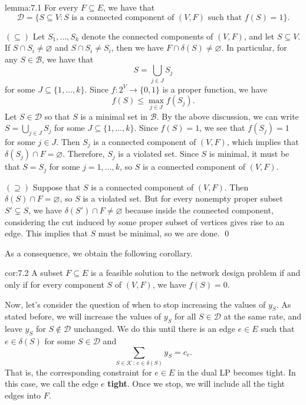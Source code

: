 \begin{lemma}{lemma:7.1} 
    For every $F \subseteq E$, we have that 
    \[ \mathcal{D} = \{S \subseteq V : \text{$S$ is a connected component of $(V, F)$ 
    such that $f(S) = 1$}\}. \]
\end{lemma}\vspace{-0.25cm}
\begin{pf}
    $(\subseteq)$  Let $S_1, \dots, S_k$ denote the connected components of $(V, F)$, 
    and let $S \subseteq V$. If $S \cap S_i \neq \varnothing$ and 
    $S \cap S_i \neq S_i$, then we have $F \cap \delta(S) \neq \varnothing$. 
    In particular, for any $S \in \mathcal{B}$, we have that 
    \[ S = \bigcup_{j \in J} S_j \] 
    for some $J \subseteq \{1, \dots, k\}$. Since $f : 2^V \to \{0, 1\}$ 
    is a proper function, we have 
    \[ f(S) \leq \max_{j\in J} f(S_j). \] 
    Let $S \in \mathcal{D}$ so that $S$ is a minimal set in $\mathcal{B}$.
    By the above discussion, we can write $S = \bigcup_{j\in J} S_j$ for 
    some $J \subseteq \{1, \dots, k\}$. Since $f(S) = 1$, we see that 
    $f(S_j) = 1$ for some $j \in J$. Then $S_j$ is a connected component 
    of $(V, F)$, which implies that $\delta(S_j) \cap F = \varnothing$. 
    Therefore, $S_j$ is a violated set. Since $S$ is minimal, 
    it must be that $S = S_j$ for some $j = 1, \dots, k$, so $S$ 
    is a connected component of $(V, F)$. 

    $(\supseteq)$ Suppose that $S$ is a connected component of $(V, F)$. 
    Then $\delta(S) \cap F = \varnothing$, so $S$ is a violated set. 
    But for every nonempty proper subset $S' \subsetneq S$, we have 
    $\delta(S') \cap F \neq \varnothing$ because inside the connected 
    component, considering the cut induced by some proper subset of vertices 
    gives rise to an edge. This implies that $S$ must be minimal, so 
    we are done. \qed 
\end{pf}\vspace{-0.25cm}

As a consequence, we obtain the following corollary. 

\begin{cor}{cor:7.2}
    A subset $F \subseteq E$ is a feasible solution to the network design 
    problem if and only if for every component $S$ of $(V, F)$, 
    we have $f(S) = 0$. 
\end{cor}\vspace{-0.25cm}

Now, let's consider the question of when to stop increasing the values of $y_S$. 
As stated before, we will increase the values of $y_S$ for all $S \in \mathcal{D}$
at the same rate, and leave $y_S$ for $S \notin \mathcal{D}$ unchanged. 
We do this until there is an edge $e \in E$ such that $e \in \delta(S)$ 
for some $S \in \mathcal{D}$ and 
\[ \sum_{S\in\mathcal{K}\,:\,e\in\delta(S)} y_S = c_e. \] 
That is, the corresponding constraint for $e \in E$ in the dual LP becomes tight. 
In this case, we call the edge $e$ {\bf tight}. Once we stop, we will 
include all the tight edges into $F$. 

